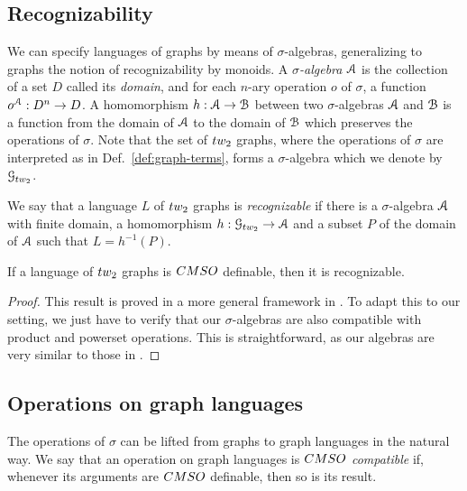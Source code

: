 \subsection{Recognizability}
 We can specify languages of graphs by means of $\sigma$-algebras, generalizing to graphs the notion of recognizability by monoids.  A \emph{$\sigma$-algebra} $\mathcal A$ is the collection of a set $D$ called its \emph{domain}, and for each $n$-ary operation  $o$ of $\sigma$, a function $o^\mathcal A:D^n\to D$.
 A homomorphism $h:\mathcal A\to \mathcal B$ between two $\sigma$-algebras $\mathcal A$ and $\mathcal B$ is a function from the domain of $\mathcal A$ to the domain of $\mathcal B$  which preserves the operations of $\sigma$.  Note that the set of $\TWT$ graphs, where the operations of $\sigma$ are interpreted as in Def.~\ref{def:graph-terms}, forms a $\sigma$-algebra which we denote by $\G_\TWT$.
  

\begin{definition}[Recognizability]
 We say that a language $L$ of $\TWT$ graphs is \emph{recognizable} if there is a $\sigma$-algebra $\mathcal A$ with finite domain, a homomorphism $h:\G_\TWT\to \A$ and a subset $P$ of the domain of $\mathcal A$ such that $L=h^{-1}(P)$.
\end{definition}

\begin{theorem}\label{thm:CMSO->Rec}
If a language of $\TWT$ graphs is $\CMSO$ definable, then it is recognizable.
\end{theorem}

\begin{proof} 
This result is proved in a more general framework in \cite{Mikolaj-long}. To adapt this to our setting, we just have to verify that our $\sigma$-algebras are also compatible with product and powerset operations. This is straightforward, as our algebras are very similar to those in \cite{Mikolaj-long}.
\end{proof}

\subsection{Operations on graph languages}\label{sec:op-lang}

The operations of $\sigma$ can be lifted from graphs to graph languages in the natural way. We say that an operation on graph languages is \emph{$\CMSO$ compatible} if, whenever its arguments are $\CMSO$ definable, then so is its result. 


